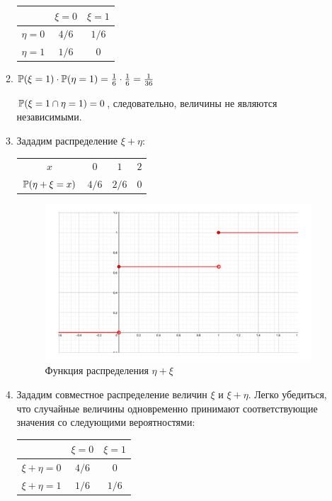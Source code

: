 \begin{enumerate}
\begin{enumerate}
\begin{center}
	\begin{tabular}{ccc}
		\toprule
		      & $\xi = 0$ & $\xi = 1$ \\ \midrule
		$\eta = 0$ & $4/6$ & $1/6 $ \\
		$\eta = 1$ & $1/6$  & 0 \\ \bottomrule
	\end{tabular}
\end{center}


\item
$\P(\xi = 1) \cdot \P(\eta = 1) = \frac{1}{6} \cdot \frac{1}{6} = \frac{1}{36}$

$\P(\xi = 1 \cap \eta = 1) = 0$, следовательно, величины не являются независимыми.

\item

Зададим распределение $\xi + \eta$:

\begin{center}
\begin{tabular}{cccc}
\toprule
$x$ & $0$ & $1$ & $2$ \\
$\P(\eta + \xi = x)$ & $4/6$ & $2/6$ & $0$ \\ 
\bottomrule
\end{tabular}
\end{center}

\begin{figure}[ht!]
	\centering
	\includegraphics[width= 100mm]{images/kr1_2018.pdf}
	\caption{Функция распределения $\eta + \xi$}
\end{figure}


\item
Зададим совместное распределение величин $\xi$ и $\xi + \eta$. Легко убедиться,
что случайные величины одновременно принимают соответствующие значения со следующими
вероятностями:

\begin{center}
	\begin{tabular}{ccc}
		\toprule
		& $\xi = 0$ & $\xi = 1$ \\ \midrule
		$\xi + \eta = 0$ & $4/6$  & $0$ \\
		$\xi + \eta = 1$ & $1/6$  & $1/6$ \\
		\bottomrule
	\end{tabular}
\end{center}


\end{enumerate}
\end{enumerate}
